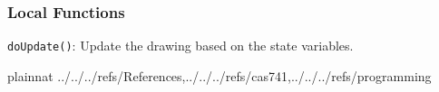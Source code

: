 \documentclass[12pt, titlepage]{article}
\newcommand{\code}[1]{\texttt{#1}}
\begin{document}
\subsubsection{Local Functions}
\code{doUpdate()}: Update the drawing based on the state variables.

\newpage





 {plainnat}
 {../../../refs/References,../../../refs/cas741,../../../refs/programming}

\newpage
\end{document}
